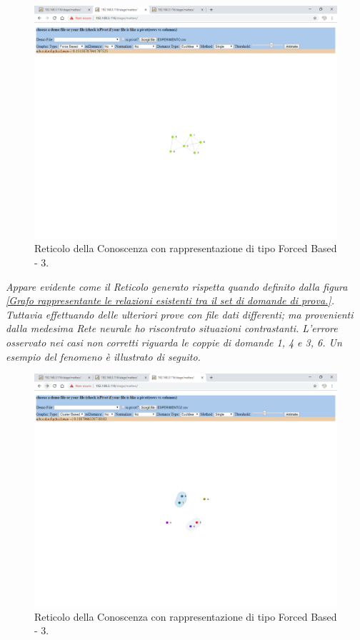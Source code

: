 \noindent
\begin{figure}[H]
\centering
	\includegraphics[width=1\linewidth]{./image/reticoloCorretto5.png}
	\caption{Reticolo della Conoscenza con rappresentazione di tipo Forced Based - 3.}
	\label{Reticolo della Conoscenza con rappresentazione di tipo Forced Based - 3.}
\end{figure}
\noindent
\textit{Appare evidente come il Reticolo generato rispetta quando definito dalla figura \ref{Grafo rappresentante le relazioni esistenti tra il set di domande di prova.}.\\
Tuttavia effettuando delle ulteriori prove con file dati differenti; ma provenienti dalla medesima Rete neurale ho riscontrato situazioni contrastanti. L'errore osservato nei casi non corretti riguarda le coppie di domande 1, 4 e 3, 6. Un esempio del fenomeno \`e illustrato di seguito.}
\begin{figure}[H]
\centering
	\includegraphics[width=1\linewidth]{./image/reticoloNonCorretto1.png}
	\caption{Reticolo della Conoscenza con rappresentazione di tipo Forced Based - 3.}
	\label{Reticolo della Conoscenza con rappresentazione di tipo Forced Based - 3.}
\end{figure}
